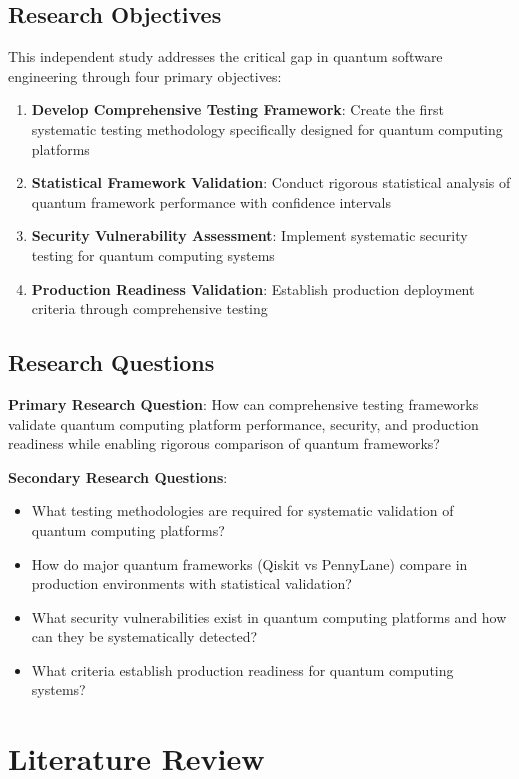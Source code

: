 \documentclass[12pt,a4paper]{article}
\begin{document}
\subsection{Research Objectives}

This independent study addresses the critical gap in quantum software engineering through four primary objectives:

\begin{enumerate}
\item \textbf{Develop Comprehensive Testing Framework}: Create the first systematic testing methodology specifically designed for quantum computing platforms
\item \textbf{Statistical Framework Validation}: Conduct rigorous statistical analysis of quantum framework performance with confidence intervals
\item \textbf{Security Vulnerability Assessment}: Implement systematic security testing for quantum computing systems
\item \textbf{Production Readiness Validation}: Establish production deployment criteria through comprehensive testing
\end{enumerate}

\subsection{Research Questions}

\textbf{Primary Research Question}: How can comprehensive testing frameworks validate quantum computing platform performance, security, and production readiness while enabling rigorous comparison of quantum frameworks?

\textbf{Secondary Research Questions}:
\begin{itemize}
\item What testing methodologies are required for systematic validation of quantum computing platforms?
\item How do major quantum frameworks (Qiskit vs PennyLane) compare in production environments with statistical validation?
\item What security vulnerabilities exist in quantum computing platforms and how can they be systematically detected?
\item What criteria establish production readiness for quantum computing systems?
\end{itemize}

\section{Literature Review}
\end{document}
